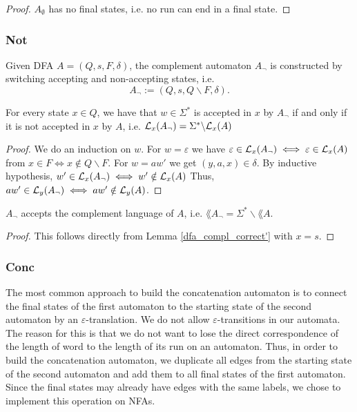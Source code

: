 \begin{proof}
    $A_\emptyset$ has no final states, i.e. no run can end in a final state.
\end{proof}




\subsubsection{Not}
\begin{definition}
    Given DFA $A=(Q,s,F,\delta)$, the complement automaton $A_\neg$ is constructed by switching accepting and non-accepting states, i.e.
    \begin{equation*}
       A_\neg := (Q,s,Q\backslash F,\delta). 
    \end{equation*}
\end{definition}

\begin{lemma}
    \label{dfa_compl_correct'}
    For every state $x \in Q$, we have that $w \in \Sigma^*$ is accepted in $x$ by $A_\neg$ if and only if it is not accepted in $x$ by $A$, i.e. $\mathcal{L}_{x}(A_\neg) = \Sigma^* \backslash \mathcal{L}_{x}(A)$ 
\end{lemma}
\begin{proof}
    We do an induction on $w$.
    For $w = \varepsilon$ we have $\varepsilon \in \mathcal{L}_{x}(A_\neg) \iff \varepsilon \in \mathcal{L}_{x}(A)$ from
    $x \in F \iff x \notin Q\backslash F$.
    For $w = aw'$ we get $(y,a,x) \in \delta$. 
    By inductive hypothesis, $w' \in \mathcal{L}_{x}(A_\neg) \iff w' \notin \mathcal{L}_{x}(A)$
    Thus, $aw' \in \mathcal{L}_{y}(A_\neg) \iff aw' \notin \mathcal{L}_{y}(A)$.
\end{proof}
\begin{lemma}
    $A_\neg$ accepts the complement language of $A$, i.e. $\lang{A_\neg} = \Sigma^* \backslash \lang{A}$.
    \label{dfa_compl_correct}
\end{lemma}
\begin{proof}
    This follows directly from Lemma \ref{dfa_compl_correct'} with $x = s$.
\end{proof}


\subsubsection{Conc}
The most common approach to build the concatenation automaton is to connect
the final states of the first automaton to the starting state of the second automaton
by an $\varepsilon$-translation. 
We do not allow $\varepsilon$-transitions in our automata. 
The reason for this is that we do not want to lose the direct correspondence 
of the length of word to the length of its run on an automaton.
Thus, in order to build the concatenation automaton, we duplicate all edges from
the starting state of the second automaton and add them to all final states 
of the first automaton.
Since the final states may already have edges with the same labels, 
we chose to implement this operation on NFAs.

